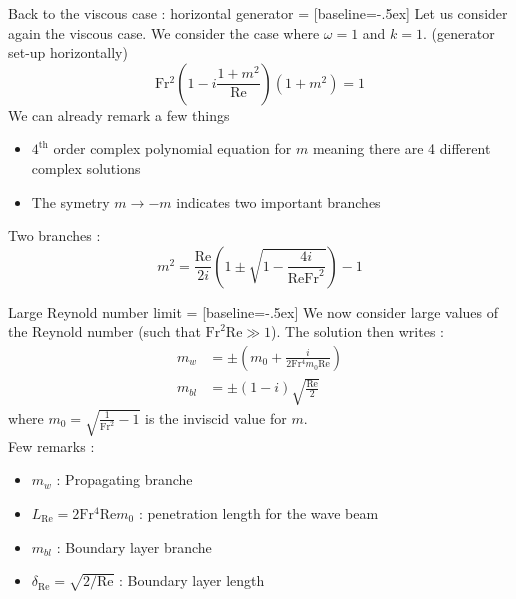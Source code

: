 \documentclass[10pt]{beamer}
\begin{document}
\begin{frame}[fragile]{Back to the viscous case : horizontal generator}
   = [baseline=-.5ex]
  Let us consider again the viscous case. We consider the case where $\omega=1$ and $k=1$. (generator set\--up horizontally)
  \begin{equation*}
    \mathrm{Fr^{2}}\left(1-i\frac{1+m^{2}}{\mathrm{Re}}\right)\left(1+m^{2}\right)=1
  \end{equation*}
  We can already remark a few things
  \begin{itemize}
    \item $4^{\mathrm{th}}$ order complex polynomial equation for $m$ meaning there are 4 different complex solutions
    \item The symetry $m\to-m$ indicates two important branches
  \end{itemize}
  Two branches :
  \begin{equation*}
    m^{2}=\frac{\mathrm{Re}}{2i}\left(1\pm\sqrt{1-\frac{4i}{\mathrm{Re}\mathrm{Fr}^{2}}}\right)-1
  \end{equation*}
\end{frame}

\begin{frame}[fragile]{Large Reynold number limit}
   = [baseline=-.5ex]
  We now consider large values of the Reynold number (such that $\mathrm{Fr}^2\mathrm{Re}\gg1$). The solution then writes :
  \begin{align*}
    m_{w}&=\pm\left(m_{0}+\frac{i}{2\mathrm{Fr^{4}}m_{0}\mathrm{Re}}\right)\\
    m_{bl}&=\pm \left(1-i\right)\sqrt{\frac{\mathrm{Re}}{2}}
  \end{align*}
  where $m_{0}=\sqrt{\frac{1}{\mathrm{Fr}^{2}}-1}$ is the inviscid value for $m$.\\
  Few remarks :
  \begin{itemize}
    \item $m_{w}$ : Propagating branche
    \item $L_{\mathrm{Re}}=2\mathrm{Fr^{4}}\mathrm{Re}m_{0}$ : penetration length for the wave beam
    \item $m_{bl}$ : Boundary layer branche
    \item $\delta_{\mathrm{Re}}=\sqrt{2/\mathrm{Re}}$ : Boundary layer length
  \end{itemize}
\end{frame}
\end{document}
